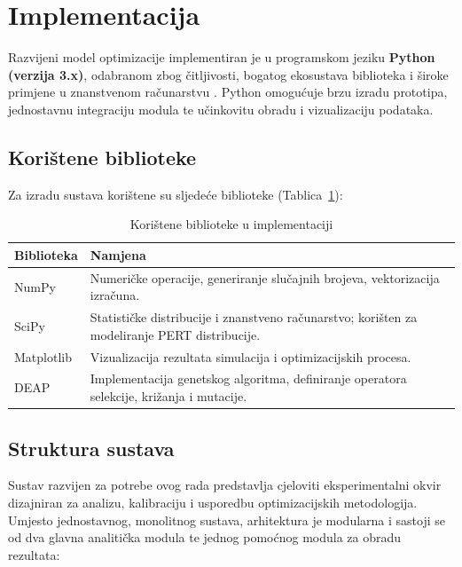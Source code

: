 
\section{Implementacija}

Razvijeni model optimizacije implementiran je u programskom jeziku \textbf{Python (verzija 3.x)}, odabranom zbog čitljivosti, bogatog ekosustava biblioteka i široke primjene u znanstvenom računarstvu \cite{PythonSoftwareFoundation}. Python omogućuje brzu izradu prototipa, jednostavnu integraciju modula te učinkovitu obradu i vizualizaciju podataka.

\subsection{Korištene biblioteke}

Za izradu sustava korištene su sljedeće biblioteke (Tablica~\ref{tab:biblioteke}):

\begin{table}[H]
\centering
\caption{Korištene biblioteke u implementaciji}
\label{tab:biblioteke}
\begin{tabular}{|l|p{10cm}|}
\hline
\textbf{Biblioteka} & \textbf{Namjena} \\ \hline
NumPy & Numeričke operacije, generiranje slučajnih brojeva, vektorizacija izračuna. \\ \hline
SciPy & Statističke distribucije i znanstveno računarstvo; korišten za modeliranje PERT distribucije. \\ \hline
Matplotlib & Vizualizacija rezultata simulacija i optimizacijskih procesa. \\ \hline
DEAP & Implementacija genetskog algoritma, definiranje operatora selekcije, križanja i mutacije. \\ \hline
\end{tabular}
\end{table}

\subsection{Struktura sustava}


Sustav razvijen za potrebe ovog rada predstavlja cjeloviti eksperimentalni okvir dizajniran za analizu, kalibraciju i usporedbu optimizacijskih metodologija. Umjesto jednostavnog, monolitnog sustava, arhitektura je modularna i sastoji se od dva glavna analitička modula te jednog pomoćnog modula za obradu rezultata:

